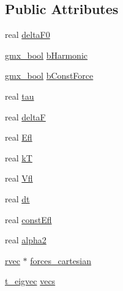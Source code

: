 \subsection*{\-Public \-Attributes}
\begin{DoxyCompactItemize}
\item 
real \hyperlink{structt__edflood_a38c4149d57cba7b0fc958172349f88b2}{delta\-F0}
\item 
\hyperlink{include_2types_2simple_8h_a8fddad319f226e856400d190198d5151}{gmx\-\_\-bool} \hyperlink{structt__edflood_af7e718b7dc9ad60dd074da61a4aa26ca}{b\-Harmonic}
\item 
\hyperlink{include_2types_2simple_8h_a8fddad319f226e856400d190198d5151}{gmx\-\_\-bool} \hyperlink{structt__edflood_a7a27e1cdd5ce0e71e80b4e407da59048}{b\-Const\-Force}
\item 
real \hyperlink{structt__edflood_a7c82455c506aa4512f212e7c36052531}{tau}
\item 
real \hyperlink{structt__edflood_ab27ce309e68a0f845f694051496d1749}{delta\-F}
\item 
real \hyperlink{structt__edflood_a57854c933faae32c65509c40e8a28c55}{\-Efl}
\item 
real \hyperlink{structt__edflood_ae628faf51b01e1f5a489e3795fdd33de}{k\-T}
\item 
real \hyperlink{structt__edflood_a593d4dc8c7759c26308bddcb2bc957f8}{\-Vfl}
\item 
real \hyperlink{structt__edflood_a4e1cb45c98991ecc0005220ad27c1131}{dt}
\item 
real \hyperlink{structt__edflood_aea1b3a81f370cfd8c32ee2d77d43372c}{const\-Efl}
\item 
real \hyperlink{structt__edflood_aedb9b030bb630711eef8090289e412c9}{alpha2}
\item 
\hyperlink{share_2template_2gromacs_2types_2simple_8h_aa02a552a4abd2f180c282a083dc3a999}{rvec} $\ast$ \hyperlink{structt__edflood_a65115d901b2dc199352560c1c865c848}{forces\-\_\-cartesian}
\item 
\hyperlink{structt__eigvec}{t\-\_\-eigvec} \hyperlink{structt__edflood_a2d7aeb339809d50df3b4695aeabfa4bb}{vecs}
\end{DoxyCompactItemize}


